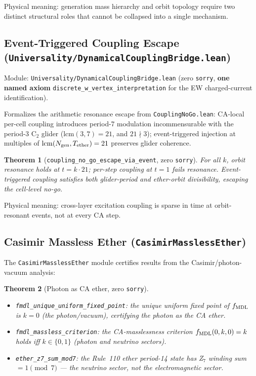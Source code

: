 \documentclass[11pt,a4paper]{article}
\newtheorem{theorem}{Theorem}[section]
\theoremstyle{definition}
\begin{document}
Physical meaning: generation mass hierarchy and orbit topology require two
distinct structural roles that cannot be collapsed into a single mechanism.

\subsection{Event-Triggered Coupling Escape\linebreak
  (\texttt{\small Universality/DynamicalCouplingBridge.lean})}\label{subsec:dynamical-coupling-bridge}

Module: \texttt{Universality/DynamicalCouplingBridge.lean} (zero
\lstinline|sorry|, \textbf{one named axiom}
\lstinline|discrete_w_vertex_interpretation| for the EW charged-current identification).

Formalizes the arithmetic resonance escape from \texttt{CouplingNoGo.lean}:
CA-local per-cell coupling introduces period-7 modulation incommensurable with
the period-3 C$_2$ glider ($\mathrm{lcm}(3,7)=21$, and $21 \nmid 3$);
event-triggered injection at multiples of $\mathrm{lcm}(N_{\rm gen}, T_{\rm ether})=21$
preserves glider coherence.

\begin{theorem}[\lstinline|coupling_no_go_escape_via_event|, zero \texttt{sorry}]
For all $k$, orbit resonance holds at $t = k\cdot 21$; per-step coupling at
$t=1$ fails resonance.  Event-triggered coupling satisfies both glider-period
and ether-orbit divisibility, escaping the cell-level no-go.
\end{theorem}

Physical meaning: cross-layer excitation coupling is sparse in time at
orbit-resonant events, not at every CA step.

\subsection{Casimir Massless Ether (\texttt{CasimirMasslessEther})}\label{subsec:casimir-massless}

The \texttt{CasimirMasslessEther} module certifies results from the Casimir/photon-vacuum
analysis:

\begin{theorem}[Photon as CA ether, zero \texttt{sorry}]
\begin{itemize}[nosep]
\item \lstinline|fmdl_unique_uniform_fixed_point|: the unique uniform fixed point of
  $f_{\rm MDL}$ is $k=0$ (the photon/vacuum), certifying the photon as the CA ether.
\item \lstinline|fmdl_massless_criterion|: the CA-masslessness criterion
  $f_{\rm MDL}(0,k,0) = k$ holds iff $k\in\{0,1\}$ (photon and neutrino sectors).
\item \lstinline|ether_z7_sum_mod7|: the Rule~110 ether period-14 state has
  Z$_7$ winding sum $= 1 \pmod{7}$ — the neutrino sector, not the electromagnetic sector.
\end{itemize}
\end{theorem}
\end{document}
